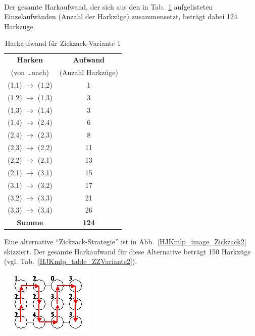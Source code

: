 \documentclass[fontsize=12pt,doubleside,openany,listof=totoc,listof=flat,listof=nochaptergap,numbers=noenddot]{scrbook}
\theoremstyle{style}
\begin{document}
\phantom \\
\noindent Der gesamte Harkaufwand, der sich aus den in Tab.~\ref{HJKmlp_table_ZZVariante1}
aufgelisteten Einzelaufwänden (Anzahl der Harkzüge) zusammensetzt, beträgt dabei 
124 Harkzüge.
 
\renewcommand{\arraystretch}{0.96}
\begin{table}[H]
\caption{Harkaufwand für Zickzack-Variante 1}
\label{HJKmlp_table_ZZVariante1}
\centering 
\begin{scriptsize}
\begin{tabular}{|>{}c|>{}c|}
\hline
\textbf{Harken} & \textbf{Aufwand}\\
(von \ldots nach) & (Anzahl Harkzüge)\\
\hline
(1,1) $\rightarrow$ (1,2) & 1\\
\hline
(1,2) $\rightarrow$ (1,3) & 3\\
\hline
(1,3) $\rightarrow$ (1,4) & 3\\
\hline
(1,4) $\rightarrow$ (2,4) & 6\\
\hline
(2,4) $\rightarrow$ (2,3) & 8\\
\hline
(2,3) $\rightarrow$ (2,2) & 11\\
\hline
(2,2) $\rightarrow$ (2,1) & 13\\
\hline
(2,1) $\rightarrow$ (3,1) & 15\\
\hline
(3,1) $\rightarrow$ (3,2) & 17\\
\hline
(3,2) $\rightarrow$ (3,3) & 21\\
\hline
(3,3) $\rightarrow$ (3,4) & 26\\
\hline
\textbf{Summe} & \textbf{124}\\
\hline
\end{tabular}
\end{scriptsize} 
\end{table}
\renewcommand{\arraystretch}{1}

\noindent Eine alternative "`Zickzack-Strategie"' ist in Abb.~\ref{HJKmlp_image_Zickzack2}
skizziert. Der gesamte Harkaufwand für diese Alternative beträgt 150 Harkzüge 
(vgl. Tab.~\ref{HJKmlp_table_ZZVariante2}). 

\begin{center}
\begin{minipage}{\textwidth}
\centerline{\includegraphics[angle=0,scale=0.8]{Figures/Laub/Zickzack2.jpg}}
\label{HJKmlp_image_Zickzack2}
\end{minipage}
\end{center}
\end{document}
